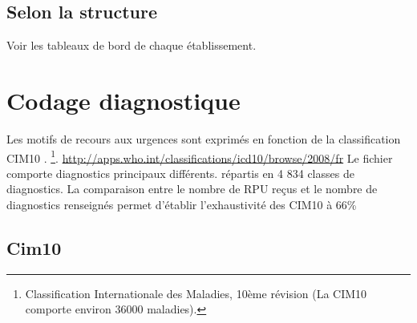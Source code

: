 \documentclass[12pt,english,french,twoside]{book}\usepackage[]{graphicx}\usepackage[]{color}
\begin{document}

\section{Selon la structure}

Voir les tableaux de bord de chaque établissement.

% 
% 
% 
% 
% 



\newpage
\chapter{Codage diagnostique}

%




Les motifs de recours aux urgences sont exprimés en fonction de la classification CIM10 \cite{10}.
\footnote{Classification Internationale des Maladies, 10ème révision (La CIM10 comporte environ 36000 maladies).}.
\url{http://apps.who.int/classifications/icd10/browse/2008/fr}
Le fichier comporte  diagnostics principaux différents.
répartis en 4 834 classes de diagnostics.
La comparaison entre le nombre de RPU reçus et le nombre de diagnostics renseignés permet d'établir l'exhaustivité des CIM10 à 66\% 


\section{Cim10}
\end{document}

